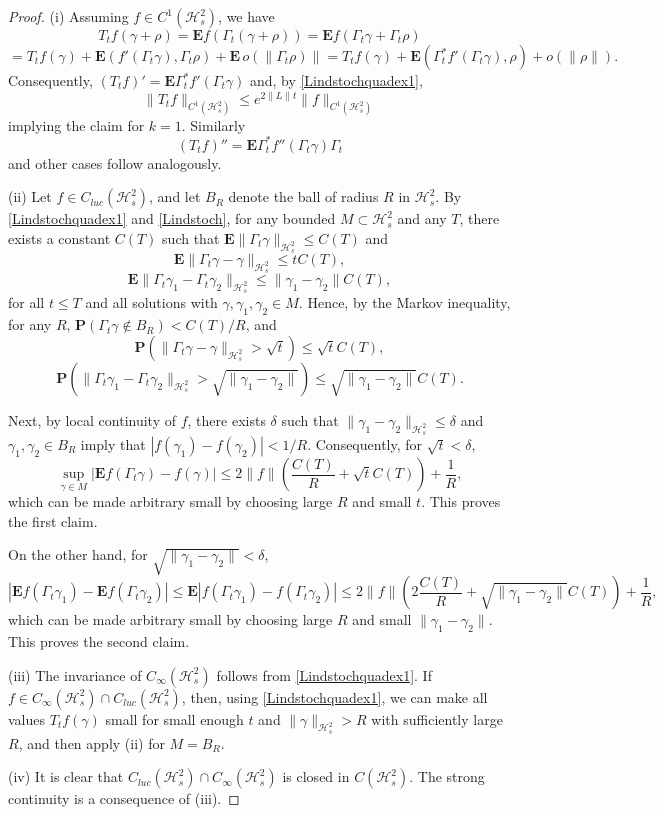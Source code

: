 \documentclass[12pt]{article}
\def\HC{\mathcal{H}}
\def\E{\mathbf{E}}
\def\P{\mathbf{P}}
\def\de{\delta}
\def\ga{\gamma}
\newcommand{\Ga}{\Gamma}
\begin{document}
\begin{proof}
(i) Assuming $f\in C^1(\HC^2_s)$, we have
\[
T_tf(\ga+\rho)=\E f(\Ga_t(\ga+\rho))=\E f(\Ga_t \ga+\Ga_t\rho)
\]
\[
=T_tf(\ga)+ \E (f'(\Ga_t\ga), \Ga_t \rho)+\E \, o(\|\Ga_t\rho)\|
=T_t f(\ga)+\E (\Ga_t^* f'(\Ga_t \ga), \rho)+o(\|\rho\|).
\]
Consequently, $(T_tf)'=\E \Ga_t^* f'(\Ga_t\ga)$ and,
by \eqref{Lindstochquadex1},
\[
\|T_tf\|_{C^1(\HC^2_s)}\le e^{2\|L\|t} \|f\|_{C^1(\HC^2_s)}
\]
implying the claim for $k=1$.
Similarly
\begin{equation}
\label{eqLinsdesem}
(T_tf)''=\E \Ga_t^* f''(\Ga_t\ga) \Ga_t
\end{equation}
and other cases follow analogously.

(ii) Let  $f\in C_{luc}(\HC^2_s)$, and let $B_R$ denote the ball of radius $R$ in $\HC^2_s$.
By \eqref{Lindstochquadex1} and \eqref{Lindstoch}, for any bounded $M\subset \HC^2_s$ and any $T$,
there exists a constant $C(T)$ such that $\E \|\Ga_t \ga \|_{\HC^2_s}\le C(T)$ and
\[
\E \|\Ga_t\ga-\ga\|_{\HC^2_s}\le t C(T),
\]
\[
\E \|\Ga_t\ga_1-\Ga_t \ga_2\|_{\HC^2_s}\le \|\ga_1-\ga_2\| C(T),
\]
for all $t\le T$ and all solutions with $\ga,\ga_1,\ga_2 \in M$.
Hence, by the Markov inequality, for any $R$,
 $\P (\Ga_t\ga \notin B_R)<C(T)/R$, and
\[
\P (\|\Ga_t\ga-\ga\|_{\HC^2_s}>\sqrt t) \le \sqrt t C(T),
\]
\[
\P (\|\Ga_t\ga_1-\Ga_t\ga_2\|_{\HC^2_s}>\sqrt{\|\ga_1-\ga_2\|}) \le \sqrt {\|\ga_1-\ga_2\|}  C(T).
\]

Next, by local continuity of $f$, there exists $\de$ such that
$\|\ga_1-\ga_2\|_{\HC^2_s}\le\de $ and $\ga_1,\ga_2\in B_R$ imply
that $|f(\ga_1)-f(\ga_2)|<1/R$. Consequently, for $\sqrt t <\de$,
\[
\sup_{\ga\in M} |\E f(\Ga_t \ga)-f(\ga)|
\le 2\|f\| (\frac{C(T)}{R}+\sqrt t C(T)) +\frac{1}{R},
\]
which can be made arbitrary small by choosing large $R$ and small $t$. This proves the first claim.

On the other hand, for $\sqrt{\|\ga_1-\ga_2\|}<\de$,
\[
|\E f(\Ga_t \ga_1)-\E f(\Ga_t \ga_2)|\le  \E |f(\Ga_t \ga_1)-f(\Ga_t \ga_2)|
\le 2\|f\| (2 \frac{C(T)}{R}+\sqrt {\|\ga_1-\ga_2\|}  C(T)) +\frac{1}{R},
\]
which can be made arbitrary small by choosing large $R$ and small $\|\ga_1-\ga_2\|$. This proves the second claim.

(iii) The invariance of $ C_{\infty}(\HC^2_s)$ follows from \eqref{Lindstochquadex1}.
If $f\in C_{\infty}(\HC^2_s)\cap C_{luc}(\HC^2_s)$, then, using \eqref{Lindstochquadex1},
we can make all values $T_tf(\ga)$ small for small enough $t$ and $\|\ga\|_{\HC^2_s}>R$
with sufficiently large $R$, and then apply (ii) for $M=B_R$.

(iv) It is clear that $C_{luc}(\HC^2_s)\cap C_{\infty}(\HC^2_s)$
is closed in $C(\HC^2_s)$. The strong continuity is a consequence of (iii).
\end{proof}
\end{document}
